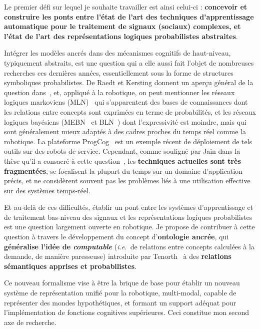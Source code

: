 \documentclass[a4paper]{article}
\newcommand{\ie}{{\textit{i.e.~}}}
\begin{document}
Le premier défi sur lequel je souhaite travailler est ainsi celui-ci :
\textbf{concevoir et construire les ponts entre l'état de l'art des techniques
d'apprentissage automatique pour le traitement de signaux (sociaux)
complexes, et l'état de l'art des représentations logiques probabilistes
abstraites}.

Intégrer les modèles ancrés dans des mécanismes cognitifs de
haut-niveau, typiquement abstraits, est une question qui a elle aussi fait
l'objet de nombreuses recherches ces dernières années, essentiellement sous la
forme de structures symboliques probabilistes. De Raedt et Kersting donnent un
aperçu général de la question dans~\cite{deraedt2008probabilistic}, et, appliqué
à la robotique, on peut mentionner les réseaux logiques markoviens
(MLN)~\cite{richardson2006markov} qui s'apparentent des bases de connaissances
dont les relations entre concepts sont exprimées en terme de probabilités, et
les réseaux logiques bayésiens (MEBN~\cite{laskey2008mebn} et
BLN~\cite{jain2009bayesian}) dont l'expressivité est moindre, mais qui sont
généralement mieux adaptés à des cadres proches du temps réel comme la
robotique. La plateforme {\sc ProgCog}~\cite{jain2009equipping} est un exemple
récent de déploiement de tels outils sur des robots de service. Cependant, comme
souligné par Jain dans la thèse qu'il a consacré à cette
question~\cite{jain2012probabilistic}, les \textbf{techniques actuelles sont
très fragmentées}, se focalisent la plupart du temps sur un domaine
d'application précis, et ne considèrent souvent pas les problèmes liés à une
utilisation effective sur des systèmes temps-réel.

Et au-delà de ces difficultés, établir un pont entre les systèmes d'apprentissage
et de traitement bas-niveau des signaux et les représentations logiques
probabilistes est une question largement ouverte en robotique. Je
propose de contribuer à cette question à travers le développement du concept
d'\textbf{ontologie ancrée}, qui \textbf{généralise l'idée de \emph{computable}}
(\ie de relations entre concepts calculées à la demande, de manière
paresseuse) introduite par Tenorth~\cite{tenorth2009knowrob} à des
\textbf{relations sémantiques apprises et probabilistes}.

Ce nouveau formalisme vise à être la brique de base pour établir un nouveau
système de représentation unifié pour la robotique, multi-modal, capable de
représenter des mondes hypothétiques, et formant un support adéquat pour l'implémentation
de fonctions cognitives supérieures. Ceci constitue mon second axe de recherche.
\end{document}
